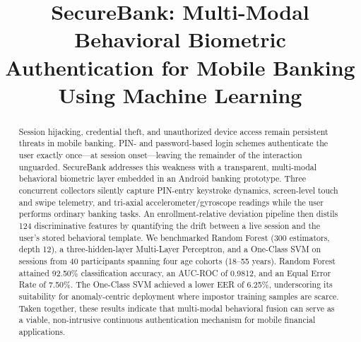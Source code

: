 \documentclass[conference]{IEEEtran}
\begin{document}
\title{SecureBank: Multi-Modal Behavioral Biometric Authentication for Mobile Banking Using Machine Learning}

\author{
\and
{}
\and
{}
\and
{}
}

\maketitle

\begin{abstract}
Session hijacking, credential theft, and unauthorized device access remain persistent threats in mobile banking. PIN- and password-based login schemes authenticate the user exactly once---at session onset---leaving the remainder of the interaction unguarded. SecureBank addresses this weakness with a transparent, multi-modal behavioral biometric layer embedded in an Android banking prototype. Three concurrent collectors silently capture PIN-entry keystroke dynamics, screen-level touch and swipe telemetry, and tri-axial accelerometer/gyroscope readings while the user performs ordinary banking tasks. An enrollment-relative deviation pipeline then distils 124 discriminative features by quantifying the drift between a live session and the user's stored behavioral template. We benchmarked Random Forest (300 estimators, depth 12), a three-hidden-layer Multi-Layer Perceptron, and a One-Class SVM on sessions from 40 participants spanning four age cohorts (18--55 years). Random Forest attained 92.50\% classification accuracy, an AUC-ROC of 0.9812, and an Equal Error Rate of 7.50\%. The One-Class SVM achieved a lower EER of 6.25\%, underscoring its suitability for anomaly-centric deployment where impostor training samples are scarce. Taken together, these results indicate that multi-modal behavioral fusion can serve as a viable, non-intrusive continuous authentication mechanism for mobile financial applications.
\end{abstract}
\end{document}
